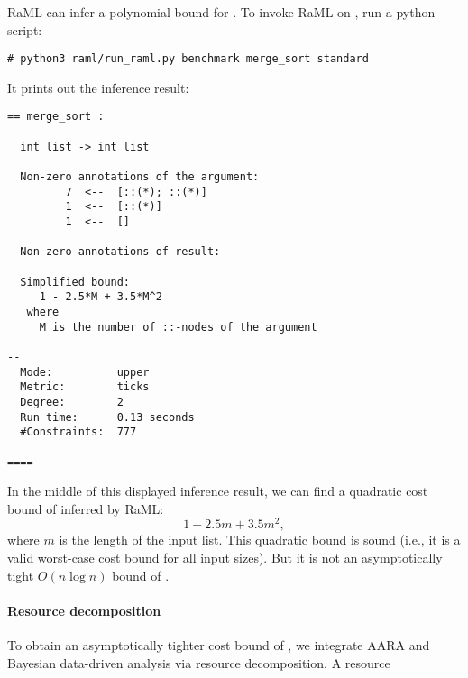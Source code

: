 RaML can infer a polynomial bound for \mergesort{}.
%
To invoke RaML on \mergesort{}, run a python script:
\begin{verbatim}
# python3 raml/run_raml.py benchmark merge_sort standard
\end{verbatim}
%
It prints out the inference result:
\begin{verbatim}
== merge_sort :

  int list -> int list

  Non-zero annotations of the argument:
         7  <--  [::(*); ::(*)]
         1  <--  [::(*)]
         1  <--  []

  Non-zero annotations of result:

  Simplified bound:
     1 - 2.5*M + 3.5*M^2
   where
     M is the number of ::-nodes of the argument

--
  Mode:          upper
  Metric:        ticks
  Degree:        2
  Run time:      0.13 seconds
  #Constraints:  777

====
\end{verbatim}
%
In the middle of this displayed inference result, we can find a quadratic cost
bound of \mergesort{} inferred by RaML:
\begin{equation}
  1 - 2.5 m + 3.5 m^2,
\end{equation}
where $m$ is the length of the input list.
%
This quadratic bound is sound (i.e., it is a valid worst-case cost bound for all
input sizes).
%
But it is not an asymptotically tight $O(n \log n)$ bound of \mergesort{}.

\paragraph{Resource decomposition}

To obtain an asymptotically tighter cost bound of \mergesort{}, we integrate
AARA and Bayesian data-driven analysis via resource decomposition.
%
A resource 
